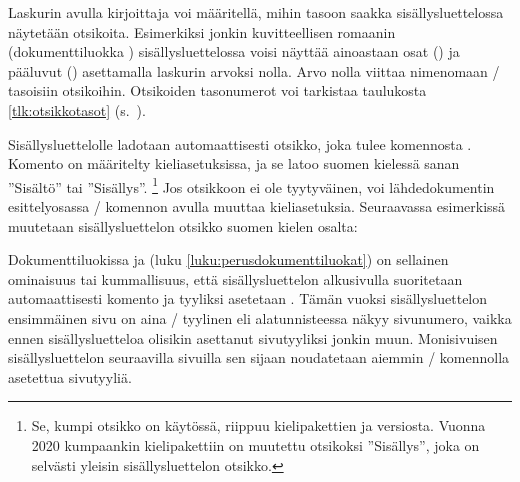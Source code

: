 \begin{koodilohkosis}
\tableofcontents
\end{koodilohkosis}

Laskurin  avulla kirjoittaja voi määritellä, mihin
tasoon saakka sisällysluettelossa näytetään otsikoita. Esimerkiksi
jonkin kuvitteellisen romaanin (dokumenttiluokka )
sisällysluettelossa voisi näyttää ainoastaan osat () ja
pääluvut () asettamalla laskurin arvoksi nolla. Arvo
nolla viittaa nimenomaan \-/ tasoisiin otsikoihin.
Otsikoiden tasonumerot voi tarkistaa taulukosta \ref{tlk:otsikkotasot}
(s.~\pageref{tlk:otsikkotasot}).

\begin{koodilohkosis}
\setcounter{tocdepth}{0}
\end{koodilohkosis}

Sisällysluettelolle ladotaan automaattisesti otsikko, joka tulee
komennosta . Komento on määritelty
kieliasetuksissa, ja se latoo suomen kielessä sanan ''Sisältö'' tai
''Sisällys''.%
\footnote{Se, kumpi otsikko on käytössä, riippuu kielipakettien
   ja  versiosta. Vuonna 2020
  kumpaankin kielipakettiin on muutettu otsikoksi ''Sisällys'', joka on
  selvästi yleisin sisällysluettelon otsikko.} Jos otsikkoon ei ole
tyytyväinen, voi lähdedokumentin esittelyosassa \-/
komennon avulla muuttaa kieliasetuksia. Seuraavassa esimerkissä
muutetaan sisällysluettelon otsikko suomen kielen osalta:

\begin{koodilohkosis}
\addto{\captionsfinnish}{
  \renewcommand{\contentsname}{Sisällysluettelo}
}
\end{koodilohkosis}

Dokumenttiluokissa  ja  (luku
\ref{luku:perusdokumenttiluokat}) on sellainen ominaisuus tai
kummallisuus, että sisällysluettelon alkusivulla suoritetaan
automaattisesti komento  ja tyyliksi asetetaan
. Tämän vuoksi sisällysluettelon ensimmäinen sivu on aina
\-/ tyylinen eli alatunnisteessa näkyy sivunumero, vaikka
ennen sisällysluetteloa olisikin asettanut sivutyyliksi jonkin muun.
Monisivuisen sisällysluettelon seuraavilla sivuilla sen sijaan
noudatetaan aiemmin \-/ komennolla asetettua
sivutyyliä.


